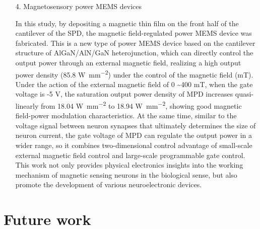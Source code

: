 \begin{itemize}
\item [4.] Magnetosensory power MEMS devices 

In this study, by depositing a magnetic thin film on the front half of the cantilever  of the SPD, the magnetic field-regulated power MEMS device was fabricated. This is a new type of power MEMS device based on the cantilever structure of AlGaN/AlN/GaN heterojunction, which can directly control the output power through an external magnetic field, realizing a high output power density (85.8 \unit{\W\per\square\mm}) under the control of the magnetic field (\unit{\milli\tesla}). Under the action of the external magnetic field of 0 \sim 400 \unit{\milli\tesla}, when the gate voltage is -5 \unit{\V}, the saturation output power density of MPD increases quasi-linearly from 18.04 \unit{\W\per\square\mm} to 18.94 \unit{\W\per\square\mm}, showing good magnetic field-power modulation characteristics. At the same time, similar to the voltage signal between neuron synapses that ultimately determines the size of neuron current, the gate voltage of MPD can regulate the output power in a wider range, so it combines two-dimensional control advantage of small-scale external magnetic field control and large-scale programmable gate control. This work not only provides physical electronics insights into the working mechanism of magnetic sensing neurons in the biological sense, but also promote the development of various neuroelectronic devices.
\end{itemize}


\section{Future work}

